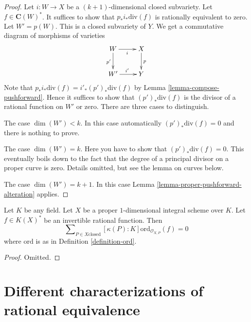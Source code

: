 \begin{proof}
Let $i : W \to X$ be a $(k + 1)$-dimensional closed subvariety.
Let $f \in \mathbf{C}(W)^*$. It suffices to show that
$p_*i_*\text{div}(f)$ is rationally equivalent to zero.
Let $W' = p(W)$. This is a closed subvariety of $Y$.
We get a commutative diagram of morphisms of varieties
$$
\xymatrix{
W \ar[r]_i \ar[d]_{p'} & X \ar[d]^p \\
W' \ar[r]^{i'} & Y
}
$$
Note that $p_*i_*\text{div}(f) = i'_*(p')_*\text{div}(f)$ by
Lemma \ref{lemma-compose-pushforward}. Hence
it suffices to show that $(p')_*\text{div}(f)$
is the divisor of a rational function on $W'$ or zero.
There are three cases to distinguish.

\medskip\noindent
The case $\dim(W') < k$. In this case automatically $(p')_*\text{div}(f) = 0$
and there is nothing to prove.

\medskip\noindent
The case $\dim(W') = k$. Here you have to show that
$(p')_*\text{div}(f) = 0$. This eventually boils down to
the fact that the degree of a principal divisor on a proper
curve is zero. Details omitted, but see the lemma on curves below.

\medskip\noindent
The case $\dim(W') = k + 1$. In this case
Lemma \ref{lemma-proper-pushforward-alteration} applies.
\end{proof}

\begin{lemma}
\label{lemma-curve-principal-divisor}
Let $K$ be any field.
Let $X$ be a proper $1$-dimensional integral scheme over $K$.
Let $f \in K(X)^*$ be an invertible rational function.
Then
$$
\sum\nolimits_{P \in X \text{closed}}
[\kappa(P) : K] \text{ord}_{\mathcal{O}_{X, P}}(f)
=
0
$$
where $\text{ord}$ is as in Definition \ref{definition-ord}.
\end{lemma}

\begin{proof}
Omitted.
\end{proof}














\section{Different characterizations of rational equivalence}
\label{section-different-rational-equivalence}

